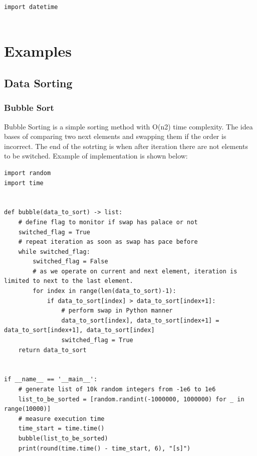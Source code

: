\documentclass{article}
\begin{document}
\begin{lstlisting}[style=pystyle] 
import datetime


\end{lstlisting}


\newpage
\section{Examples}
\subsection{Data Sorting}
\subsubsection{Bubble Sort}
	Bubble Sorting is a simple sorting method with O(n2) time complexity. The idea bases of comparing two next elements and swapping them if the order is incorrect. The end of the sotrting is when after iteration there are not elements to be switched. Example of implementation is shown below:
\begin{lstlisting}[style=pystyle]
import random
import time


def bubble(data_to_sort) -> list:
    # define flag to monitor if swap has palace or not
    switched_flag = True
    # repeat iteration as soon as swap has pace before
    while switched_flag:
        switched_flag = False
        # as we operate on current and next element, iteration is limited to next to the last element.
        for index in range(len(data_to_sort)-1):
            if data_to_sort[index] > data_to_sort[index+1]:
                # perform swap in Python manner
                data_to_sort[index], data_to_sort[index+1] = data_to_sort[index+1], data_to_sort[index]
                switched_flag = True
    return data_to_sort


if __name__ == '__main__':
    # generate list of 10k random integers from -1e6 to 1e6
    list_to_be_sorted = [random.randint(-1000000, 1000000) for _ in range(10000)]
    # measure execution time
    time_start = time.time()
    bubble(list_to_be_sorted)
    print(round(time.time() - time_start, 6), "[s]")
\end{lstlisting}
\end{document}
